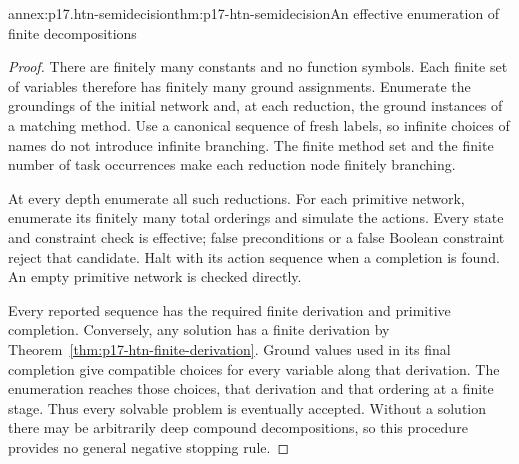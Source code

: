 \begin{annexitem}{annex:p17.htn-semidecision}{thm:p17-htn-semidecision}{An effective enumeration of finite decompositions}
\begin{proof}
There are finitely many constants and no function symbols. Each finite set
of variables therefore has finitely many ground assignments. Enumerate the
groundings of the initial network and, at each reduction, the ground instances
of a matching method. Use a canonical sequence of fresh labels, so infinite
choices of names do not introduce infinite branching. The finite method set
and the finite number of task occurrences make each reduction node finitely
branching.

At every depth enumerate all such reductions. For each primitive network,
enumerate its finitely many total orderings and simulate the actions. Every
state and constraint check is effective; false preconditions or a false Boolean
constraint reject that candidate. Halt with its action sequence when a
completion is found. An empty primitive network is checked directly.

Every reported sequence has the required finite derivation and primitive
completion. Conversely, any solution has a finite derivation by
Theorem~\ref{thm:p17-htn-finite-derivation}. Ground values used in its final
completion give compatible choices for every variable along that derivation.
The enumeration reaches those choices, that derivation and that ordering at
a finite stage. Thus every solvable problem is eventually accepted. Without
a solution there may be arbitrarily deep compound decompositions, so this
procedure provides no general negative stopping rule.
\end{proof}
\end{annexitem}

